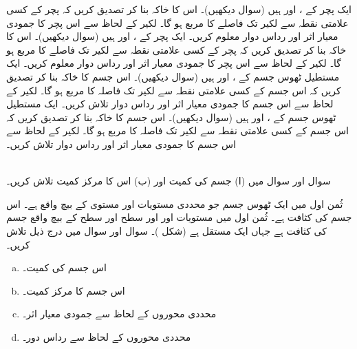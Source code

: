 ایک پچر  کے ،  اور  ہیں     (سوال  دیکھیں)۔  اس کا خاکہ بنا کر تصدیق کریں کہ  پچر کے کسی علامتی  نقطہ   سے  لکیر   تک  فاصلے کا مربع   ہو گا۔ لکیر  کے لحاظ سے اس پچر کا جمودی معیار اثر اور رداس دوار معلوم کریں۔
ایک پچر  کے ،  اور  ہیں     (سوال  دیکھیں)۔  اس کا خاکہ بنا کر تصدیق کریں کہ  پچر کے کسی علامتی  نقطہ   سے  لکیر   تک  فاصلے کا مربع   ہو گا۔ لکیر  کے لحاظ سے اس پچر کا جمودی معیار اثر اور رداس دوار معلوم کریں۔
ایک مستطیل  ٹھوس جسم کے ،  اور  ہیں (سوال  دیکھیں)۔ اس جسم کا خاکہ بنا کر تصدیق کریں  کہ اس جسم کے کسی علامتی نقطہ  سے لکیر   تک فاصلہ کا مربع  ہو گا۔ لکیر  کے لحاظ سے اس جسم کا جمودی معیار اثر اور رداس دوار تلاش کریں۔
ایک مستطیل  ٹھوس جسم کے ،  اور  ہیں (سوال  دیکھیں)۔  اس جسم کا خاکہ بنا کر تصدیق کریں  کہ اس جسم کے کسی علامتی نقطہ  سے لکیر   تک فاصلہ کا مربع  ہو گا۔ لکیر  کے لحاظ سے اس جسم کا جمودی معیار اثر اور رداس دوار تلاش کریں۔

\\
سوال  اور سوال  میں (ا) جسم کی کمیت اور (ب)  اس کا مرکز کمیت تلاش کریں۔

ثُمن اول میں ایک ٹھوس جسم  جو محددی مستویات اور مستوی      کے بیچ واقع ہے۔ اس جسم کی کثافت  ہے۔
ثُمن اول میں مستویات  اور   اور سطح  اور سطح  کے بیچ واقع  جسم کی کثافت  ہے  جہاں  ایک مستقل ہے (شکل )۔
سوال  اور سوال  میں درج ذیل تلاش کریں۔
\begin{enumerate}[a.]
\item
اس جسم کی کمیت۔
\item
اس جسم کا مرکز کمیت۔
\item
محددی محوروں کے لحاظ سے جمودی معیار اثر۔
\item
محددی محوروں کے لحاظ سے رداس دور۔
\end{enumerate}

